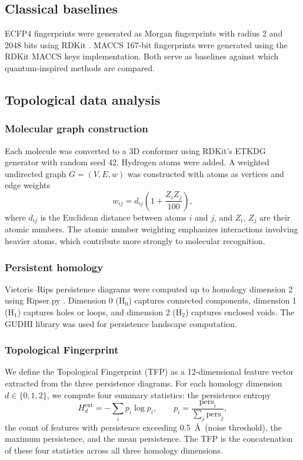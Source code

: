 \documentclass[11pt,a4paper]{article}
\begin{document}
\subsection{Classical baselines}

ECFP4 fingerprints were generated as Morgan fingerprints with radius 2 and \num{2048} bits using RDKit \citep{rdkit_2024}. MACCS \num{167}-bit fingerprints were generated using the RDKit MACCS keys implementation. Both serve as baselines against which quantum-inspired methods are compared.

\subsection{Topological data analysis}

\subsubsection{Molecular graph construction}

Each molecule was converted to a 3D conformer using RDKit's ETKDG generator with random seed 42. Hydrogen atoms were added. A weighted undirected graph $G = (V, E, w)$ was constructed with atoms as vertices and edge weights
\begin{equation}
w_{ij} = d_{ij}\left(1 + \frac{Z_i Z_j}{100}\right),
\end{equation}
where $d_{ij}$ is the Euclidean distance between atoms $i$ and $j$, and $Z_i$, $Z_j$ are their atomic numbers. The atomic number weighting emphasizes interactions involving heavier atoms, which contribute more strongly to molecular recognition.

\subsubsection{Persistent homology}

Vietoris--Rips persistence diagrams were computed up to homology dimension 2 using Ripser.py \citep{ripser_2019}. Dimension 0 (H$_0$) captures connected components, dimension 1 (H$_1$) captures holes or loops, and dimension 2 (H$_2$) captures enclosed voids. The GUDHI library \citep{gudhi_2024} was used for persistence landscape computation.

\subsubsection{Topological Fingerprint}

We define the Topological Fingerprint (TFP) as a \num{12}-dimensional feature vector extracted from the three persistence diagrams. For each homology dimension $d \in \{0, 1, 2\}$, we compute four summary statistics: the persistence entropy
\begin{equation}
H_d^{\mathrm{ent}} = -\sum_i p_i \log p_i, \qquad p_i = \frac{\mathrm{pers}_i}{\sum_j \mathrm{pers}_j},
\end{equation}
the count of features with persistence exceeding \SI{0.5}{\angstrom}\ (noise threshold), the maximum persistence, and the mean persistence. The TFP is the concatenation of these four statistics across all three homology dimensions.
\end{document}
